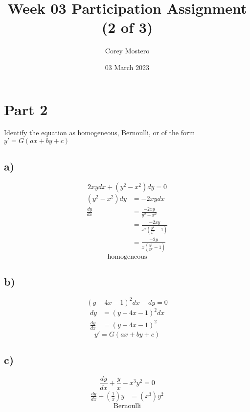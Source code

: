 \documentclass{article}
\title{Week 03 Participation Assignment (2 of 3)}
\date{03 March 2023}
\author{Corey Mostero}
\begin{document}
\newcommand{\hr}{\par\noindent\rule{\textwidth}{0.4pt}}

\maketitle
\newpage

\tableofcontents

\section{Part 2}
Identify the equation as homogeneous, Bernoulli, or of the form $ y' = G(ax + by + c) $

\subsection{a)}
$$ 2xydx + (y^2 - x^2)dy = 0 $$
\begin{align*}
	(y^2 - x^2)dy & = -2xydx \\
	\frac{dy}{dx} & = \frac{-2xy}{y^2 - x^2} \\
				  & = \frac{-2xy}{x^2(\frac{y^2}{x^2} - 1)} \\
				  & = \frac{-2y}{x(\frac{y^2}{x^2} - 1)}
\end{align*}
\begin{equation*}
	\boxed{\text{homogeneous}}
\end{equation*}

\subsection{b)}
$$ (y - 4x - 1)^2dx - dy = 0 $$
\begin{align*}
	dy & = (y - 4x - 1)^2dx \\
	\frac{dy}{dx} & = (y - 4x - 1)^2
\end{align*}
\begin{equation*}
	\boxed{
		y' = G(ax + by + c)
	}
\end{equation*}

\subsection{c)}
$$ \frac{dy}{dx} + \frac{y}{x} - x^3y^2 = 0 $$
\begin{align*}
	\frac{dy}{dx} + \left( \frac{1}{x} \right)y & = (x^3)y^2
\end{align*}
\begin{equation*}
	\boxed{\text{Bernoulli}}
\end{equation*}
\end{document}
